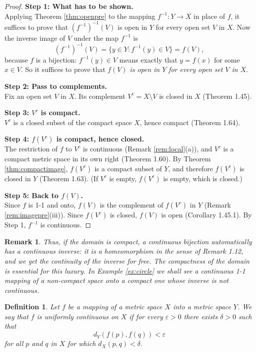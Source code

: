 \documentclass{article}
\theoremstyle{mythm}
\newtheorem{definition}[theorem]{Definition}
\newtheorem{remark}[theorem]{Remark}
\begin{document}
\begin{proof}
\textbf{Step 1: What has to be shown.}\\
Applying Theorem \ref{thm:openpre} to the mapping $f^{-1} : Y \to X$ in place of $f$, it suffices to prove that $(f^{-1})^{-1}(V)$ is open in $Y$ for every open set $V$ in $X$. Now the inverse image of $V$ under the map $f^{-1}$ is
\[
(f^{-1})^{-1}(V) = \{y \in Y : f^{-1}(y) \in V\} = f(V),
\]
because $f$ is a bijection: $f^{-1}(y) \in V$ means exactly that $y = f(x)$ for some $x \in V$. So it suffices to prove that \textit{$f(V)$ is open in $Y$ for every open set $V$ in $X$}.

\textbf{Step 2: Pass to complements.}\\
Fix an open set $V$ in $X$. Its complement $V^c = X \setminus V$ is closed in $X$ (Theorem 1.45).

\textbf{Step 3: $V^c$ is compact.}\\
$V^c$ is a closed subset of the compact space $X$, hence compact (Theorem 1.64).

\textbf{Step 4: $f(V^c)$ is compact, hence closed.}\\
The restriction of $f$ to $V^c$ is continuous (Remark \ref{rem:local}(a)), and $V^c$ is a compact metric space in its own right (Theorem 1.60). By Theorem \ref{thm:compactimage}, $f(V^c)$ is a compact subset of $Y$, and therefore $f(V^c)$ is closed in $Y$ (Theorem 1.63). (If $V^c$ is empty, $f(V^c)$ is empty, which is closed.)

\textbf{Step 5: Back to $f(V)$.}\\
Since $f$ is 1-1 and onto, $f(V)$ is the complement of $f(V^c)$ in $Y$ (Remark \ref{rem:imagepre}(iii)). Since $f(V^c)$ is closed, $f(V)$ is open (Corollary 1.45.1). By Step 1, $f^{-1}$ is continuous.
\end{proof}

\begin{remark}\label{rem:homeo}
Thus, if the domain is compact, a continuous bijection automatically has a continuous inverse: it is a homeomorphism in the sense of Remark 1.12, and we get the continuity of the inverse for free. The compactness of the domain is essential for this luxury. In Example \ref{ex:circle} we shall see a continuous 1-1 mapping of a non-compact space onto a compact one whose inverse is not continuous.
\end{remark}

\begin{definition}\label{def:unif}
Let $f$ be a mapping of a metric space $X$ into a metric space $Y$. We say that $f$ is \textit{uniformly continuous} on $X$ if for every $\varepsilon > 0$ there exists $\delta > 0$ such that
\[
d_Y(f(p), f(q)) < \varepsilon
\]
for all $p$ and $q$ in $X$ for which $d_X(p, q) < \delta$.
\end{definition}
\end{document}
